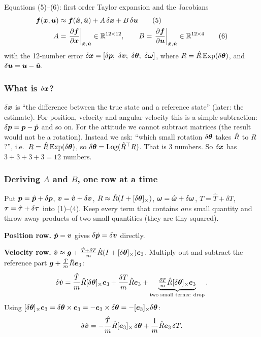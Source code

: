\begin{eqbox}{Equations (5)--(6): first order Taylor expansion and the Jacobians}
\begin{align}
  \bm{f}(\bm{x},\bm{u}) &\approx \bm{f}(\hat{\bm x},\hat{\bm{u}}) + A\,\delta\bm{x} + B\,\delta\bm{u} \tag{5}\label{eq:5}\\
  A &= \left.\frac{\partial\bm{f}}{\partial\bm{x}}\right|_{\hat{\bm x},\hat{\bm{u}}}\in\mathbb{R}^{12\times12},\qquad
  B = \left.\frac{\partial\bm{f}}{\partial\bm{u}}\right|_{\hat{\bm x},\hat{\bm{u}}}\in\mathbb{R}^{12\times4} \tag{6}\label{eq:6}
\end{align}
with the 12-number error $\delta\vx=[\delta\vp;\ \delta\vv;\ \delta\vth;\ \delta\vw]$, where $R=\hat{R}\,\mathrm{Exp}(\delta\bm{\theta})$, and $\delta\bm{u}=\bm{u}-\hat{\bm{u}}$.
\end{eqbox}

\subsubsection*{What is $\delta\bm{x}$?}
$\delta\bm{x}$ is ``the difference between the true state and a reference state'' (later: the estimate).
For position, velocity and angular velocity this is a simple subtraction: $\delta\bm{p}=\bm{p}-\hat{\bm p}$ and so on. For the
attitude we cannot subtract matrices (the result would not be a rotation). Instead we ask: ``which small rotation
$\delta\bm{\theta}$ takes $\hat{R}$ to $R$?'', i.e.\ $R=\hat{R}\,\mathrm{Exp}(\delta\bm{\theta})$, so $\delta\bm{\theta}=\mathrm{Log}(\hat{R}^\top R)$. That is 3
numbers. So $\delta\bm{x}$ has $3+3+3+3=12$ numbers.

\subsubsection*{Deriving $A$ and $B$, one row at a time}
Put $\bm{p}=\hat{\bm p}+\delta\bm{p}$, $\bm{v}=\hat{\bm v}+\delta\bm{v}$, $R\approx\hat{R}(I+[\delta\bm{\theta}]_{\times})$, $\bm{\omega}=\hat{\bm\omega}+\delta\bm{\omega}$,
$T=\hat T+\delta T$, $\bm{\tau}=\hat{\bm{\tau}}+\delta\bm{\tau}$ into (1)--(4). Keep every term that contains \emph{one} small
quantity and throw away products of two small quantities (they are tiny squared).

\textbf{Position row.} $\dot{\bm{p}}=\bm{v}$ gives $\delta\dot{\bm{p}}=\delta\bm{v}$ directly.

\textbf{Velocity row.}
$\dot{\bm{v}}\approx\bm{g}+\frac{\hat T+\delta T}{m}\hat{R}(I+[\delta\bm{\theta}]_{\times})\bm{e}_3$. Multiply out and subtract the reference
part $\bm{g}+\frac{\hat T}{m}\hat{R}\bm{e}_3$:
\[
\delta\dot{\bm{v}}=\frac{\hat T}{m}\hat{R}[\delta\bm{\theta}]_{\times}\bm{e}_3+\frac{\delta T}{m}\hat{R}\bm{e}_3+\underbrace{\tfrac{\delta T}{m}\hat{R}[\delta\bm{\theta}]_{\times}\bm{e}_3}_{\text{two small terms: drop}} .
\]
Using $[\delta\bm{\theta}]_{\times}\bm{e}_3=\delta\bm{\theta}\times\bm{e}_3=-\bm{e}_3\times\delta\bm{\theta}=-[\bm{e}_3]_{\times}\delta\bm{\theta}$:
\[
\delta\dot{\bm{v}}=-\frac{\hat T}{m}\hat{R}[\bm{e}_3]_{\times}\,\delta\bm{\theta}+\frac{1}{m}\hat{R}\bm{e}_3\,\delta T .
\]

